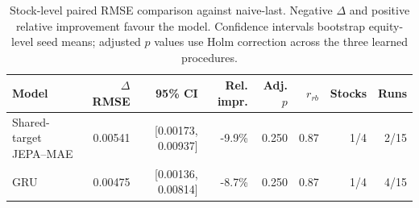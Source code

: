 \begin{table}[t]
\centering
\small
\caption{Stock-level paired RMSE comparison against naive-last. Negative $\Delta$ and positive relative improvement favour the model. Confidence intervals bootstrap equity-level seed means; adjusted $p$ values use Holm correction across the three learned procedures.}
\label{tab:paired_rmse_naive}
\begin{tabular}{lrrrrrrr}
\toprule
Model & $\Delta$RMSE & 95\% CI & Rel. impr. & Adj. $p$ & $r_{rb}$ & Stocks & Runs \\
\midrule
Shared-target JEPA--MAE & 0.00541 & [0.00173, 0.00937] & -9.9\% & 0.250 & 0.87 & 1/4 & 2/15 \\
GRU & 0.00475 & [0.00136, 0.00814] & -8.7\% & 0.250 & 0.87 & 1/4 & 4/15 \\
\bottomrule
\end{tabular}
\end{table}
